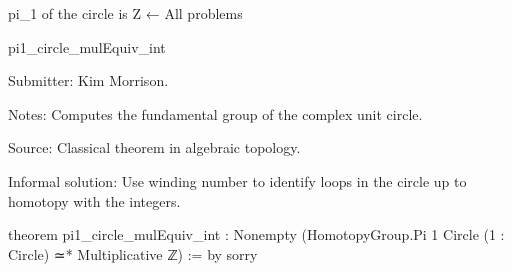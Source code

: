 pi_1 of the circle is Z
← All problems

pi1_circle_mulEquiv_int

Submitter: Kim Morrison.

Notes: Computes the fundamental group of the complex unit circle.

Source: Classical theorem in algebraic topology.

Informal solution: Use winding number to identify loops in the circle up to homotopy with the integers.

theorem pi1_circle_mulEquiv_int :
    Nonempty (HomotopyGroup.Pi 1 Circle (1 : Circle) ≃* Multiplicative ℤ) := by
  sorry
